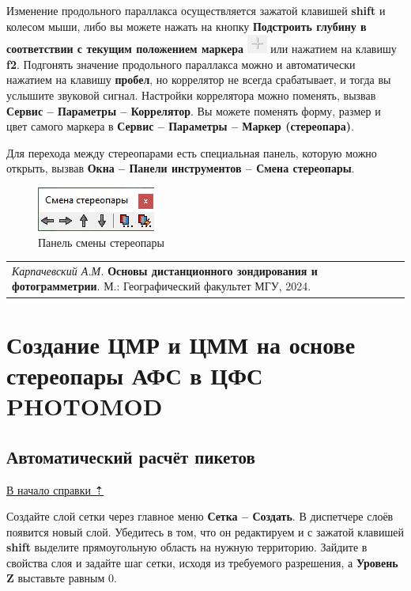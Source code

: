 \documentclass[
  12pt,
]{book}
\begin{document}
Изменение продольного параллакса осуществляется зажатой клавишей \textbf{shift} и колесом мыши, либо вы можете нажать на кнопку \textbf{Подстроить глубину в соответствии с текущим положением маркера} \includegraphics{images/Ref15/Adjust_parallax.png} или нажатием на клавишу \textbf{f2}. Подгонять значение продольного параллакса можно и автоматически нажатием на клавишу \textbf{пробел}, но коррелятор не всегда срабатывает, и тогда вы услышите звуковой сигнал. Настройки коррелятора можно поменять, вызвав \textbf{Сервис -- Параметры -- Коррелятор}. Вы можете поменять форму, размер и цвет самого маркера в \textbf{Сервис -- Параметры -- Маркер (стереопара)}.

Для перехода между стереопарами есть специальная панель, которую можно открыть, вызвав \textbf{Окна -- Панели инструментов -- Смена стереопары}.

\begin{figure}
\centering
\includegraphics{images/Ref15/Change_Stereopair.png}
\caption{Панель смены стереопары}
\end{figure}

\begin{longtable}[]{@{}l@{}}
\toprule\noalign{}
\endhead
\bottomrule\noalign{}
\endlastfoot
\emph{Карпачевский А.М.} \textbf{Основы дистанционного зондирования и фотограмметрии}. М.: Географический факультет МГУ, 2024. \\
\end{longtable}

\hypertarget{photomod_DEM}{%
\chapter{Создание ЦМР и ЦММ на основе стереопары АФС в ЦФС PHOTOMOD}\label{photomod_DEM}}

\hypertarget{photomod_DEM-pikets}{%
\section{Автоматический расчёт пикетов}\label{photomod_DEM-pikets}}

\protect\hyperlink{photomod_DEM}{В начало справки ⇡}

Создайте слой сетки через главное меню \textbf{Сетка -- Создать}. В диспетчере слоёв появится новый слой. Убедитесь в том, что он редактируем и с зажатой клавишей \textbf{shift} выделите прямоугольную область на нужную территорию. Зайдите в свойства слоя и задайте шаг сетки, исходя из требуемого разрешения, а \textbf{Уровень Z} выставьте равным 0.
\end{document}
